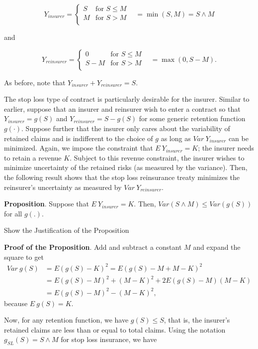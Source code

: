 \documentclass[]{book}
\theoremstyle{definition}
\theoremstyle{definition}
\theoremstyle{definition}
\theoremstyle{remark}
\begin{document}
\[
Y_{insurer} =
\begin{cases}
S & \text{for } S \le M\\
M & \text{for } S >M \\
\end{cases} \ \ \ \ = \min(S,M) = S \wedge M
\]

and

\[
Y_{reinsurer} =
\begin{cases}
0 & \text{for } S \le M\\
S- M &  \text{for } S >M \\
\end{cases} \ \ \ \  = \max(0,S-M) .
\]

As before, note that \(Y_{insurer}+Y_{reinsurer}=S\).

The stop loss type of contract is particularly desirable for the
insurer. Similar to earlier, suppose that an insurer and reinsurer wish
to enter a contract so that \(Y_{insurer}=g(S)\) and
\(Y_{reinsurer}=S-g(S)\) for some generic retention function
\(g(\cdot)\). Suppose further that the insurer only cares about the
variability of retained claims and is indifferent to the choice of \(g\)
as long as \(Var~Y_{insurer}\) can be minimized. Again, we impose the
constraint that \(E ~Y_{insurer} = K\); the insurer needs to retain a
revenue \(K\). Subject to this revenue constraint, the insurer wishes to
minimize uncertainty of the retained risks (as measured by the
variance). Then, the following result shows that the stop loss
reinsurance treaty minimizes the reinsurer's uncertainty as measured by
\(Var~Y_{reinsurer}\).

\textbf{Proposition}. Suppose that \(E~Y_{insurer}=K.\) Then,
\(Var (S \wedge M) \le Var(g(S))\) for all \(g(.)\).

Show the Justification of the Proposition

\hypertarget{toggleProofStopLoss}{}
\textbf{Proof of the Proposition}. Add and subtract a constant \(M\) and
expand the square to get \[
\begin{array}{ll}
Var~ g(S) &= E (g(S) - K)^2 = E (g(S) -M +M- K)^2 \\
&= E (g(S) -M)^2 +  (M- K)^2 +2 E (g(S) -M)(M- K) \\
&= E (g(S) -M)^2 -  (M- K)^2 ,
\end{array}
\] because \(E ~g(S)= K.\)

Now, for any retention function, we have \(g(S) \le S\), that is, the
insurer's retained claims are less than or equal to total claims. Using
the notation \(g_{SL}(S) = S \wedge M\) for stop loss insurance, we have
\end{document}
